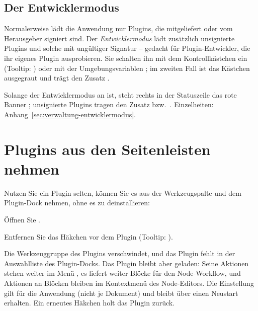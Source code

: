 \subsection{Der Entwicklermodus}\label{sec:plugin-entwicklermodus}

Normalerweise lädt die Anwendung nur Plugins, die mitgeliefert oder vom Herausgeber signiert
sind. Der \emph{Entwicklermodus} lädt zusätzlich unsignierte Plugins und solche mit ungültiger
Signatur – gedacht für Plugin-Entwickler, die ihr eigenes Plugin ausprobieren. Sie schalten ihn
mit dem Kontrollkästchen  ein (Tooltip:
) oder mit der Umgebungsvariablen ; im zweiten Fall
ist das Kästchen ausgegraut und trägt den Zusatz .

Solange der Entwicklermodus an ist, steht rechts in der Statuszeile das rote Banner
; unsignierte Plugins tragen den Zusatz
\gui{[unsigned]} bzw.\ . Einzelheiten:
Anhang~\ref{sec:verwaltung-entwicklermodus}.

\section{Plugins aus den Seitenleisten nehmen}\label{sec:plugin-seitenleisten}

Nutzen Sie ein Plugin selten, können Sie es aus der Werkzeugspalte und dem Plugin-Dock nehmen,
ohne es zu deinstallieren:

\begin{schritte}
  \item Öffnen Sie .
  \item Entfernen Sie das Häkchen vor dem Plugin (Tooltip: ).
\end{schritte}

Die Werkzeuggruppe des Plugins verschwindet, und das Plugin fehlt in der Auswahlliste des
Plugin-Docks. Das Plugin bleibt aber geladen: Seine Aktionen stehen weiter im Menü
, es liefert weiter Blöcke für den Node-Workflow, und Aktionen an Blöcken bleiben
im Kontextmenü des Node-Editors. Die Einstellung gilt für die Anwendung (nicht je Dokument) und
bleibt über einen Neustart erhalten. Ein erneutes Häkchen holt das Plugin zurück.

